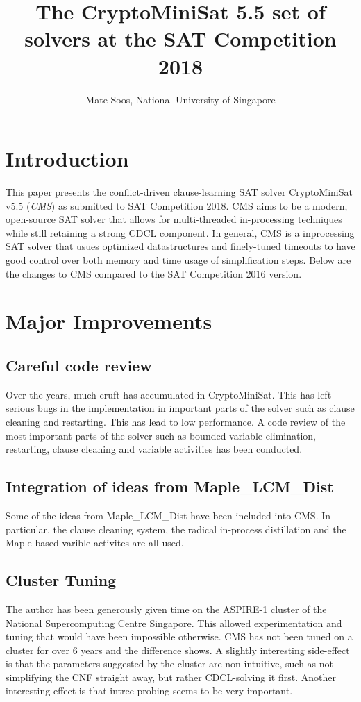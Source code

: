 \documentclass[final]{ieee}
\begin{document}
\title{The CryptoMiniSat 5.5 set of solvers at the SAT Competition 2018}
\author{Mate Soos, National University of Singapore}

\maketitle
\thispagestyle{empty}
\pagestyle{empty}

\section{Introduction}
This paper presents the conflict-driven clause-learning SAT solver CryptoMiniSat v5.5 (\emph{CMS}) as submitted to SAT Competition 2018. CMS aims to be a modern, open-source SAT solver that allows for multi-threaded in-processing techniques while still retaining a strong CDCL component. In general, CMS is a inprocessing SAT solver that usues optimized datastructures and finely-tuned timeouts to have good control over both memory and time usage of simplification steps. Below are the changes to CMS compared to the SAT Competition 2016 version.

\section{Major Improvements}
\subsection{Careful code review}
Over the years, much cruft has accumulated in CryptoMiniSat. This has left serious bugs in the implementation in important parts of the solver such as clause cleaning and restarting. This has lead to low performance. A code review of the most important parts of the solver such as bounded variable elimination, restarting, clause cleaning and variable activities has been conducted.

\subsection{Integration of ideas from Maple\_LCM\_Dist}
Some of the ideas from Maple\_LCM\_Dist\cite{maple} have been included into CMS. In particular, the clause cleaning system, the radical in-process distillation and the Maple-based varible activites are all used.

\subsection{Cluster Tuning}
The author has been generously given time on the ASPIRE-1 cluster of the National Supercomputing Centre Singapore\cite{nscc}. This allowed experimentation and tuning that would have been impossible otherwise. CMS has not been tuned on a cluster for over 6 years and the difference shows. A slightly interesting side-effect is that the parameters suggested by the cluster are non-intuitive, such as not simplifying the CNF straight away, but rather CDCL-solving it first. Another interesting effect is that intree probing\cite{HeuleJB13} seems to be very important.
\end{document}
